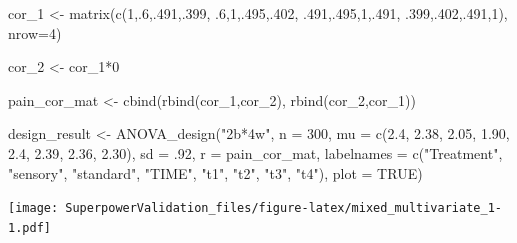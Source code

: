 \documentclass[
]{book}
\newenvironment{Shaded}{\begin{snugshade}}{\end{snugshade}}
\newcommand{\AttributeTok}[1]{\textcolor[rgb]{0.77,0.63,0.00}{#1}}
\newcommand{\ConstantTok}[1]{\textcolor[rgb]{0.00,0.00,0.00}{#1}}
\newcommand{\DecValTok}[1]{\textcolor[rgb]{0.00,0.00,0.81}{#1}}
\newcommand{\FloatTok}[1]{\textcolor[rgb]{0.00,0.00,0.81}{#1}}
\newcommand{\FunctionTok}[1]{\textcolor[rgb]{0.00,0.00,0.00}{#1}}
\newcommand{\NormalTok}[1]{#1}
\newcommand{\OtherTok}[1]{\textcolor[rgb]{0.56,0.35,0.01}{#1}}
\newcommand{\SpecialCharTok}[1]{\textcolor[rgb]{0.00,0.00,0.00}{#1}}
\newcommand{\StringTok}[1]{\textcolor[rgb]{0.31,0.60,0.02}{#1}}
\begin{document}
\begin{Shaded}
\begin{Highlighting}[]
\NormalTok{cor\_1 }\OtherTok{\textless{}{-}} \FunctionTok{matrix}\NormalTok{(}\FunctionTok{c}\NormalTok{(}\DecValTok{1}\NormalTok{,.}\DecValTok{6}\NormalTok{,.}\DecValTok{491}\NormalTok{,.}\DecValTok{399}\NormalTok{,}
\NormalTok{                  .}\DecValTok{6}\NormalTok{,}\DecValTok{1}\NormalTok{,.}\DecValTok{495}\NormalTok{,.}\DecValTok{402}\NormalTok{,}
\NormalTok{                  .}\DecValTok{491}\NormalTok{,.}\DecValTok{495}\NormalTok{,}\DecValTok{1}\NormalTok{,.}\DecValTok{491}\NormalTok{,}
\NormalTok{                  .}\DecValTok{399}\NormalTok{,.}\DecValTok{402}\NormalTok{,.}\DecValTok{491}\NormalTok{,}\DecValTok{1}\NormalTok{), }\AttributeTok{nrow=}\DecValTok{4}\NormalTok{)}

\NormalTok{cor\_2 }\OtherTok{\textless{}{-}}\NormalTok{ cor\_1}\SpecialCharTok{*}\DecValTok{0}

\NormalTok{pain\_cor\_mat }\OtherTok{\textless{}{-}} \FunctionTok{cbind}\NormalTok{(}\FunctionTok{rbind}\NormalTok{(cor\_1,cor\_2),}
                      \FunctionTok{rbind}\NormalTok{(cor\_2,cor\_1))}

\NormalTok{design\_result }\OtherTok{\textless{}{-}} \FunctionTok{ANOVA\_design}\NormalTok{(}\StringTok{"2b*4w"}\NormalTok{,}
                              \AttributeTok{n =} \DecValTok{300}\NormalTok{,}
                              \AttributeTok{mu =} \FunctionTok{c}\NormalTok{(}\FloatTok{2.4}\NormalTok{, }\FloatTok{2.38}\NormalTok{, }\FloatTok{2.05}\NormalTok{, }\FloatTok{1.90}\NormalTok{,}
                                     \FloatTok{2.4}\NormalTok{, }\FloatTok{2.39}\NormalTok{, }\FloatTok{2.36}\NormalTok{, }\FloatTok{2.30}\NormalTok{),}
                              \AttributeTok{sd =}\NormalTok{ .}\DecValTok{92}\NormalTok{,}
                              \AttributeTok{r =}\NormalTok{ pain\_cor\_mat,}
                              \AttributeTok{labelnames =} \FunctionTok{c}\NormalTok{(}\StringTok{"Treatment"}\NormalTok{, }\StringTok{"sensory"}\NormalTok{, }\StringTok{"standard"}\NormalTok{,}
                                             \StringTok{"TIME"}\NormalTok{, }\StringTok{"t1"}\NormalTok{, }\StringTok{"t2"}\NormalTok{, }\StringTok{"t3"}\NormalTok{, }\StringTok{"t4"}\NormalTok{),}
                              \AttributeTok{plot =} \ConstantTok{TRUE}\NormalTok{)}
\end{Highlighting}
\end{Shaded}

\texttt{[image: SuperpowerValidation\_files/figure-latex/mixed\_multivariate\_1-1.pdf]}
\end{document}
